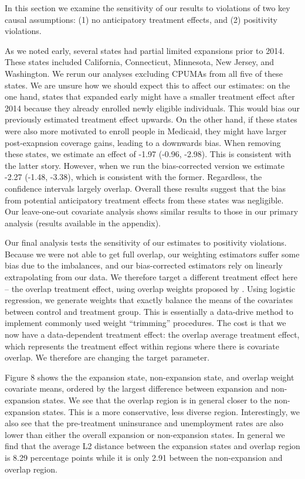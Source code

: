 \documentclass[final]{article}
\begin{document}
In this section we examine the sensitivity of our results to violations of two key causal assumptions: (1) no anticipatory treatment effects, and (2) positivity violations.

As we noted early, several states had partial limited expansions prior to 2014. These states included California, Connecticut, Minnesota, New Jersey, and Washington. We rerun our analyses excluding CPUMAs from all five of these states. We are unsure how we should expect this to affect our estimates: on the one hand, states that expanded early might have a smaller treatment effect after 2014 because they already enrolled newly eligible individuals. This would bias our previously estimated treatment effect upwards. On the other hand, if these states were also more motivated to enroll people in Medicaid, they might have larger post-exapnsion coverage gains, leading to a downwards bias. When removing these states, we estimate an effect of -1.97 (-0.96, -2.98). This is consistent with the latter story. However, when we run the bias-corrected version we estimate -2.27 (-1.48, -3.38), which is consistent with the former. Regardless, the confidence intervals largely overlap. Overall these results suggest that the bias from potential anticipatory treatment effects from these states was negligible. Our leave-one-out covariate analysis shows similar results to those in our primary analysis (results available in the appendix).

Our final analysis tests the sensitivity of our estimates to positivity violations. Because we were not able to get full overlap, our weighting estimators suffer some bias due to the imbalances, and our bias-corrected estimators rely on linearly extrapolating from our data. We therefore target a different treatment effect here -- the overlap treatment effect, using overlap weights proposed by \cite{li2018balancing}. Using logistic regression, we generate weights that exactly balance the means of the covariates between control and treatment group. This is essentially a data-drive method to implement commonly used weight ``trimming'' procedures. The cost is that we now have a data-dependent treatment effect: the overlap average treatment effect, which represents the treatment effect within regions where there is covariate overlap. We therefore are changing the target parameter.

Figure 8 shows the the expansion state, non-expansion state, and overlap weight covariate means, ordered by the largest difference between expansion and non-expansion states. We see that the overlap region is in general closer to the non-expansion states. This is a more conservative, less diverse region. Interestingly, we also see that the pre-treatment uninsurance and unemployment rates are also lower than either the overall expansion or non-expansion states. In general we find that the average L2 distance between the expansion states and overlap region is 8.29 percentage points while it is only 2.91 between the non-expansion and overlap region. 
\end{document}
